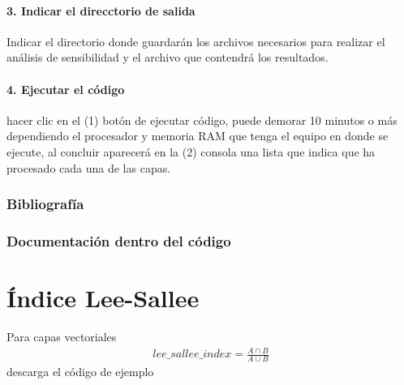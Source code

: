 \documentclass[letterpaper,10pt,spanish]{sphinxmanual}
\begin{document}
\noindent{}


\paragraph{3. Indicar el direcctorio de salida}
\label{\detokenize{analisis:indicar-el-direcctorio-de-salida}}
Indicar el directorio donde guardarán los archivos necesarios para realizar el análisis de sensibilidad
y el archivo   que contendrá los resultados.

\begin{sphinxVerbatim}[commandchars=\\\{\}]
  
\end{sphinxVerbatim}


\paragraph{4. Ejecutar el código}
\label{\detokenize{analisis:ejecutar-el-codigo}}
hacer clic en el (1) botón de ejecutar código, puede demorar 10 minutos o más dependiendo el procesador y
memoria RAM que tenga el equipo en donde se ejecute, al concluir aparecerá en la (2) consola una lista que indica que
ha procesado cada una de las capas.

\noindent{}


\subsubsection{Bibliografía}
\label{\detokenize{analisis:bibliografia}}

\subsubsection{Documentación dentro del código}
\label{\detokenize{analisis:documentacion-dentro-del-codigo}}

\section{Índice Lee-Sallee}
\label{\detokenize{leesallee:indice-lee-sallee}}\label{\detokenize{leesallee::doc}}
Para capas vectoriales
\begin{equation*}
\begin{split}lee\_sallee\_index =  \frac{A\cap B}{A\cup B}\end{split}
\end{equation*}
descarga el código de ejemplo
\end{document}

